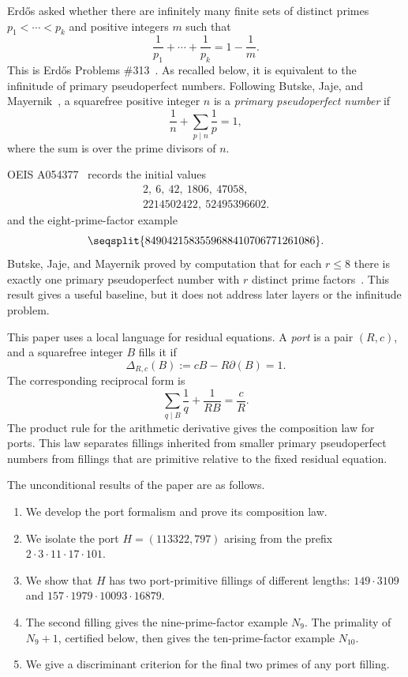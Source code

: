 \documentclass[11pt]{amsart}
\theoremstyle{plain}
\theoremstyle{definition}
\theoremstyle{remark}
\begin{document}
Erd\H{o}s asked whether there are infinitely many finite sets of distinct primes $p_1<\cdots<p_k$ and positive integers $m$ such that
\begin{equation}\label{eq:erdos-original}
        \frac1{p_1}+\cdots+\frac1{p_k}=1-\frac1m.
\end{equation}
This is Erd\H{o}s Problems \#313~\cite{ErdosProblems313}.  As recalled below, it is equivalent to the infinitude of primary pseudoperfect numbers.  Following Butske, Jaje, and Mayernik~\cite{ButskeJajeMayernik}, a squarefree positive integer $n$ is a \emph{primary pseudoperfect number} if
\begin{equation}\label{eq:ppn-def}
        \frac1n+\sum_{p\mid n}\frac1p=1,
\end{equation}
where the sum is over the prime divisors of $n$.

OEIS A054377~\cite{OEISA054377} records the initial values
\[
\begin{array}{c}
        2,\ 6,\ 42,\ 1806,\ 47058,\\[2pt]
        2214502422,\ 52495396602.
\end{array}
\]
and the eight-prime-factor example
\[
        \text{\seqsplit{8490421583559688410706771261086}}.
\]
Butske, Jaje, and Mayernik proved by computation that for each $r\le 8$ there is exactly one primary pseudoperfect number with $r$ distinct prime factors~\cite{ButskeJajeMayernik}.  This result gives a useful baseline, but it does not address later layers or the infinitude problem.

This paper uses a local language for residual equations.  A \emph{port} is a pair $(R,c)$, and a squarefree integer $B$ fills it if
\[
        \Delta_{R,c}(B):=cB-R\partial(B)=1.
\]
The corresponding reciprocal form is
\[
        \sum_{q\mid B}\frac1q+\frac1{RB}=\frac cR.
\]
The product rule for the arithmetic derivative gives the composition law for ports.  This law separates fillings inherited from smaller primary pseudoperfect numbers from fillings that are primitive relative to the fixed residual equation.

The unconditional results of the paper are as follows.
\begin{enumerate}[label=(\roman*)]
    \item We develop the port formalism and prove its composition law.
    \item We isolate the port $H=(113322,797)$ arising from the prefix $2\cdot3\cdot11\cdot17\cdot101$.
    \item We show that $H$ has two port-primitive fillings of different lengths: $149\cdot3109$ and $157\cdot1979\cdot10093\cdot16879$.
    \item The second filling gives the nine-prime-factor example $N_9$.  The primality of $N_9+1$, certified below, then gives the ten-prime-factor example $N_{10}$.
    \item We give a discriminant criterion for the final two primes of any port filling.
\end{enumerate}
\end{document}
